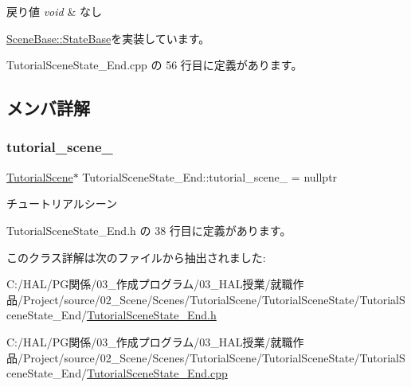 \begin{DoxyRetVals}{戻り値}
{\em void} & なし \\
\hline
\end{DoxyRetVals}


\mbox{\hyperlink{class_scene_base_1_1_state_base_ad2c6c8fd9f020eb02f64f394edee129c}{Scene\+Base\+::\+State\+Base}}を実装しています。



 Tutorial\+Scene\+State\+\_\+\+End.\+cpp の 56 行目に定義があります。



\subsection{メンバ詳解}
\mbox{\label{class_tutorial_scene_state___end_a68f36e80b530182a5b5d835425b7e829}} 
\subsubsection{\texorpdfstring{tutorial\+\_\+scene\+\_\+}{tutorial\_scene\_}}
{\footnotesize\ttfamily \mbox{\hyperlink{class_tutorial_scene}{Tutorial\+Scene}}$\ast$ Tutorial\+Scene\+State\+\_\+\+End\+::tutorial\+\_\+scene\+\_\+ = nullptr\hspace{0.3cm}{\ttfamily [protected]}}



チュートリアルシーン 



 Tutorial\+Scene\+State\+\_\+\+End.\+h の 38 行目に定義があります。



このクラス詳解は次のファイルから抽出されました\+:\begin{DoxyCompactItemize}
\item 
C\+:/\+H\+A\+L/\+P\+G関係/03\+\_\+作成プログラム/03\+\_\+\+H\+A\+L授業/就職作品/\+Project/source/02\+\_\+\+Scene/\+Scenes/\+Tutorial\+Scene/\+Tutorial\+Scene\+State/\+Tutorial\+Scene\+State\+\_\+\+End/\mbox{\hyperlink{_tutorial_scene_state___end_8h}{Tutorial\+Scene\+State\+\_\+\+End.\+h}}\item 
C\+:/\+H\+A\+L/\+P\+G関係/03\+\_\+作成プログラム/03\+\_\+\+H\+A\+L授業/就職作品/\+Project/source/02\+\_\+\+Scene/\+Scenes/\+Tutorial\+Scene/\+Tutorial\+Scene\+State/\+Tutorial\+Scene\+State\+\_\+\+End/\mbox{\hyperlink{_tutorial_scene_state___end_8cpp}{Tutorial\+Scene\+State\+\_\+\+End.\+cpp}}\end{DoxyCompactItemize}
